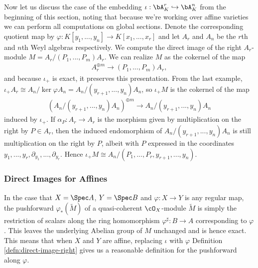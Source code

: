 \begin{example}\label{example:pushforward-Weyl-quotient}
	Now let us discuss the case of the embedding $\iota:\bA^r_K\hookrightarrow \bA^n_K$ from the beginning of this section, noting that because we're working over affine varieties we can perform all computations on global sections. Denote the corresponding quotient map by $\varphi:K[y_1,...,y_n]\to K[x_1,...,x_r]$ and let $A_r$ and $A_n$ be the $r$th and $n$th Weyl algebras respectively. We compute the direct image of the right $A_r$-module $M = A_r/(P_1,...,P_m)A_r$. We can realize $M$ as the cokernel of the map
	\begin{align*}
		A_r^{\oplus m} \to{(P_1,...,P_m)} A_r,
	\end{align*}
	and because $\iota_+$ is exact, it preserves this presentation. From the last example, $\iota_+A_r \cong A_n/\ker\varphi A_n = A_n/(y_{r+1},...,y_{n})A_n$, so $\iota_+M$ is the cokernel of the map
	\begin{align*}
		\left(A_n/(y_{r+1},...,y_{n})A_n\right)^{\oplus m} \to A_n/(y_{r+1},...,y_{n})A_n
	\end{align*}
	induced by $\iota_+$. If $\alpha_P:A_r \to A_r$ is the morphism given by multiplication on the right by $P \in A_r$, then the induced endomorphism of $A_n/(y_{r+1},...,y_{n})A_n$ is still multiplication on the right by $P$, albeit with $P$ expressed in the coordinates $y_1,...,y_r, \partial_{y_1},...,\partial_{y_r}$. Hence $\iota_+M \cong A_n/(P_1,...,P_r,y_{r+1},...,y_{n})$.
\end{example}

\subsubsection{Direct Images for Affines}
In the case that $X = \Spec A$, $Y = \Spec B$ and $\varphi:X\to Y$ is any regular map, the pushforward $\varphi_*(\tilde{M})$ of a quasi-coherent $\cO_X$-module $\tilde{M}$ is simply the restriction of scalars along the ring homomorphism $\varphi^{\sharp}:B\to A$ corresponding to $\varphi$. This leaves the underlying Abelian group of $M$ unchanged and is hence exact. This means that when $X$ and $Y$ are affine, replacing $\iota$ with $\varphi$ Definition \ref{defn:direct-image-right} gives us a reasonable definition for the pushforward along $\varphi$.


